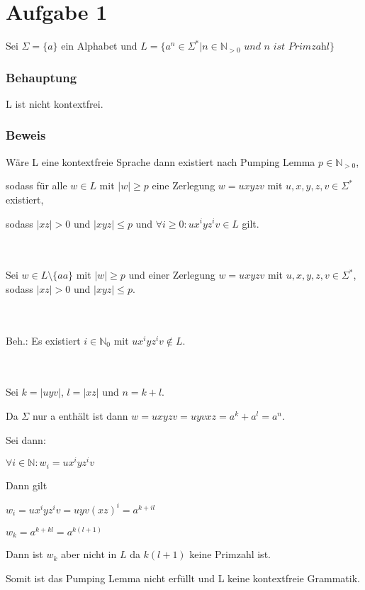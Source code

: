 \section*{Aufgabe 1}

Sei $\Sigma = \{a\} $ ein Alphabet und
$ L=\{a^n\in\Sigma^* |n \in \mathbb{N}_{>0} \textit{ und n ist Primzahl}\} $

\subsubsection*{Behauptung}

L ist nicht kontextfrei.

\subsubsection*{Beweis}

Wäre L eine kontextfreie Sprache dann existiert nach Pumping Lemma $p \in \mathbb{N}_{>0}$, 

sodass für alle $w \in L$ mit $|w|\geq p$ eine Zerlegung $w = uxyzv$ mit $u,x,y,z,v \in \Sigma^*$ existiert,

sodass $|xz|>0$ und $|xyz| \leq p$ und $\forall i \geq 0: ux^i yz^i v \in L$ gilt.

\paragraph*{}~

Sei $w \in L\setminus\{aa\}$ mit $|w|\geq p$ und einer Zerlegung $w = uxyzv$ mit $u,x,y,z,v \in \Sigma^*$, sodass $|xz|>0$ und $|xyz| \leq p$.


\paragraph*{}~

Beh.: Es existiert $i \in \mathbb{N}_{0}$ mit $ux^i yz^i v \notin L$.


\paragraph*{}~

Sei $k = |uyv|$,  $l = |xz|$ und $n = k+l$.

Da $\Sigma$ nur a enthält ist dann $w = uxyzv = uyvxz = a^k+a^l =a^n.$

Sei dann:

$\forall i \in \mathbb{N}: w_i = ux^iyz^iv $ 

Dann gilt

$w_i = ux^iyz^iv =uyv(xz)^i = a^{k+il}$

$w_k = a^{k+kl} = a ^ {k(l+1)}$

Dann ist $w_k$ aber nicht in $L$ da $k(l+1)$ keine Primzahl ist.

Somit ist das Pumping Lemma nicht erfüllt und L keine kontextfreie Grammatik.

